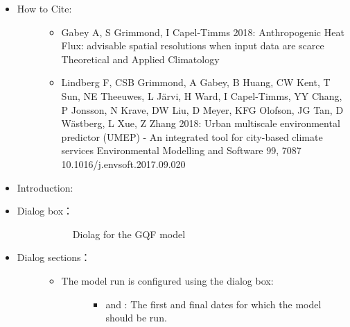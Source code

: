 \documentclass[letterpaper,10pt,english]{sphinxmanual}
\begin{document}
\begin{itemize}
\item {} \begin{description}
\item[{How to Cite:}] \leavevmode\begin{itemize}
\item {} 
Gabey A, S Grimmond, I Capel-Timms 2018: Anthropogenic Heat Flux: advisable spatial resolutions when input data are scarce Theoretical and Applied Climatology 

\item {} 
Lindberg F, CSB Grimmond, A Gabey, B Huang, CW Kent, T Sun, NE Theeuwes, L Järvi, H Ward, I Capel-Timms, YY Chang, P Jonsson, N Krave, DW Liu, D Meyer, KFG Olofson, JG Tan, D Wästberg, L Xue, Z Zhang 2018: Urban multiscale environmental predictor (UMEP) - An integrated tool for city-based climate services Environmental Modelling and Software 99, 70\textendash{}87 10.1016/j.envsoft.2017.09.020

\end{itemize}

\end{description}

\item {} \begin{description}
\item[{Introduction:}] \leavevmode
{}

\end{description}

\item {} \begin{description}
\item[{Dialog box：}] \leavevmode
\begin{figure}[htbp]
\centering
\capstart

\noindent{}
\caption{Diolag for the GQF model}\label{\detokenize{processor/Urban Energy Balance GQ:id1}}\end{figure}

\end{description}

\item {} \begin{description}
\item[{Dialog sections：}] \leavevmode\begin{itemize}
\item {} \begin{description}
\item[{The model run is configured using the dialog box:}] \leavevmode\begin{itemize}
\item {} 
 and : The first and final dates for which the model should be run.


\end{itemize}
\end{description}
\end{itemize}
\end{description}
\end{itemize}
\end{document}
